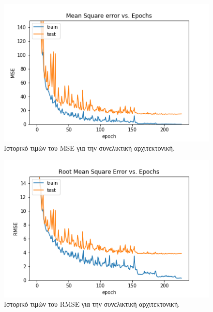 \begin{figure}[h!]
  \centering
  \includegraphics[width=\textwidth]{images/CNN_MSE.png}
  \caption{Ιστορικό τιμών του MSE για την συνελικτική αρχιτεκτονική.}
  \label{fig:CNN_MSE}
\end{figure}

\begin{figure}[h!]
  \centering
  \includegraphics[width=\textwidth]{images/CNN_RMSE.png}
  \caption{Ιστορικό τιμών του RMSE για την συνελικτική αρχιτεκτονική.}
  \label{fig:CNN_RMSE}
\end{figure}

